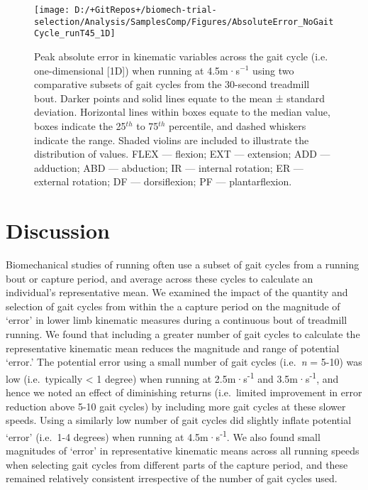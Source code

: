 \documentclass[]{elsarticle} %
\begin{document}
\begin{figure}

{\centering \texttt{[image: D:/+GitRepos+/biomech-trial-selection/Analysis/SamplesComp/Figures/AbsoluteError\_NoGaitCycle\_runT45\_1D]} 

}

\caption{Peak absolute error in kinematic variables across the gait cycle (i.e. one-dimensional [1D]) when running at 4.5m·s$^{-1}$ using two comparative subsets of gait cycles from the 30-second treadmill bout. Darker points and solid lines equate to the mean ± standard deviation. Horizontal lines within boxes equate to the median value, boxes indicate the 25$^{th}$ to 75$^{th}$ percentile, and dashed whiskers indicate the range. Shaded violins are included to illustrate the distribution of values. FLEX — flexion; EXT — extension; ADD — adduction; ABD — abduction; IR — internal rotation; ER — external rotation; DF — dorsiflexion; PF — plantarflexion.}\label{fig:samplesComp-runT45-1D}
\end{figure}

\newpage

\hypertarget{discussion}{%
\section{Discussion}\label{discussion}}

Biomechanical studies of running often use a subset of gait cycles from
a running bout or capture period, and average across these cycles to
calculate an individual's representative mean. We examined the impact of
the quantity and selection of gait cycles from within the a capture
period on the magnitude of `error' in lower limb kinematic measures
during a continuous bout of treadmill running. We found that including a
greater number of gait cycles to calculate the representative kinematic
mean reduces the magnitude and range of potential `error.' The potential
error using a small number of gait cycles (i.e.~\emph{n} = 5-10) was low
(i.e.~typically \textless{} 1 degree) when running at
2.5m·s\textsuperscript{-1} and 3.5m·s\textsuperscript{-1}, and hence we
noted an effect of diminishing returns (i.e.~limited improvement in
error reduction above 5-10 gait cycles) by including more gait cycles at
these slower speeds. Using a similarly low number of gait cycles did
slightly inflate potential `error' (i.e.~1-4 degrees) when running at
4.5m·s\textsuperscript{-1}. We also found small magnitudes of `error' in
representative kinematic means across all running speeds when selecting
gait cycles from different parts of the capture period, and these
remained relatively consistent irrespective of the number of gait cycles
used.
\end{document}
